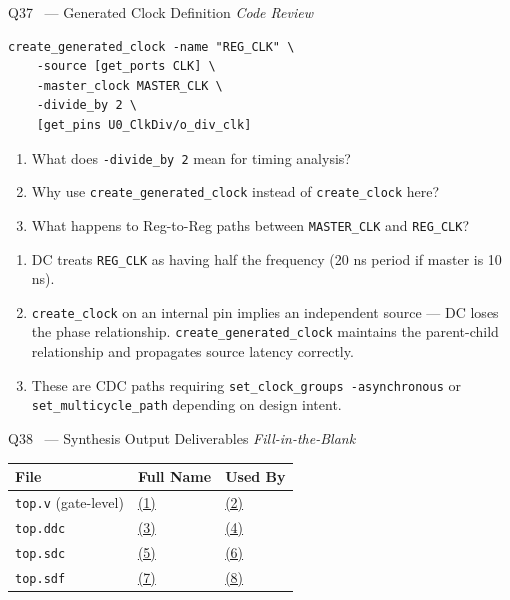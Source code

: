 \documentclass[12pt,a4paper]{article}
\newcommand{\advanced}{%
  \fbox{\textcolor{advred}{\bfseries\sffamily\small ADVANCED}}}
\newcommand{\moderate}{%
  \fbox{\textcolor{modoran}{\bfseries\sffamily\small MODERATE}}}
\begin{document}
\begin{questionbox}{Q37 \advanced\ --- Generated Clock Definition \hfill\textit{Code Review}}

\begin{lstlisting}[style=tclstyle]
create_generated_clock -name "REG_CLK" \
    -source [get_ports CLK] \
    -master_clock MASTER_CLK \
    -divide_by 2 \
    [get_pins U0_ClkDiv/o_div_clk]
\end{lstlisting}

\begin{enumerate}[label=\textbf{\alph*)}]
  \item What does \texttt{-divide\_by 2} mean for timing analysis?
  \item Why use \texttt{create\_generated\_clock} instead of \texttt{create\_clock} here?
  \item What happens to Reg-to-Reg paths between \texttt{MASTER\_CLK} and \texttt{REG\_CLK}?
\end{enumerate}
\end{questionbox}

\begin{answerbox}
\begin{enumerate}[label=\textbf{\alph*)}]
  \item DC treats \texttt{REG\_CLK} as having half the frequency (20 ns period if master is 10 ns).
  \item \texttt{create\_clock} on an internal pin implies an independent source --- DC loses the phase relationship. \texttt{create\_generated\_clock} maintains the parent-child relationship and propagates source latency correctly.
  \item These are CDC paths requiring \texttt{set\_clock\_groups -asynchronous} or \texttt{set\_multicycle\_path} depending on design intent.
\end{enumerate}
\end{answerbox}

\begin{questionbox}{Q38 \moderate\ --- Synthesis Output Deliverables \hfill\textit{Fill-in-the-Blank}}

\begin{center}
\begin{tabular}{|l|l|l|}
\hline
\rowcolor{dkblue!15}
\textbf{File} & \textbf{Full Name} & \textbf{Used By}\\
\hline
\texttt{top.v} (gate-level) & \underline{(1)} & \underline{(2)}\\
\hline
\texttt{top.ddc} & \underline{(3)} & \underline{(4)}\\
\hline
\texttt{top.sdc} & \underline{(5)} & \underline{(6)}\\
\hline
\texttt{top.sdf} & \underline{(7)} & \underline{(8)}\\
\hline
\end{tabular}
\end{center}
\end{questionbox}
\end{document}

